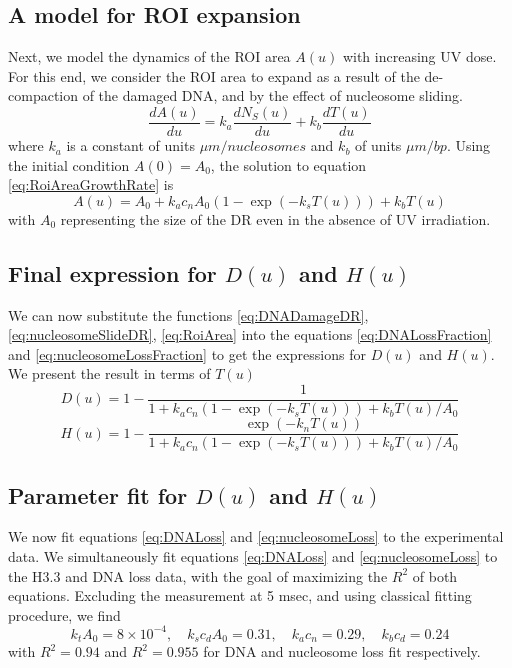 \documentclass[12pt]{article}
\begin{document}
   \subsection{A model for ROI expansion}
	Next, we model the dynamics of the ROI area $A(u)$ with increasing UV
	dose. For this end, we consider the ROI area to expand as a result of the de-compaction of the damaged DNA, and by the effect of nucleosome sliding. 			
	\begin{equation}\label{eq:RoiAreaGrowthRate}
	\frac{dA(u)}{du}=k_a\frac{dN_S(u)}{du}+k_b\frac{dT(u)}{du}
	\end{equation}
	where $k_a$ is a constant of units $\mu m/ nucleosomes$ and $k_b$ of units $\mu m/ bp$. Using the initial condition $A(0) = A_0$, the solution to equation \eqref{eq:RoiAreaGrowthRate} is
	\begin{equation}\label{eq:RoiArea}
	A(u) = A_0+ k_ac_nA_0\left(1-\exp(-k_sT(u))\right)+k_bT(u)
	\end{equation}
	 with $A_0$ representing the size of the DR even in the absence of UV irradiation.
	 
	 \subsection{Final expression for $D(u)$ and $H(u)$}
	We can now substitute the functions \eqref{eq:DNADamageDR}, \eqref{eq:nucleosomeSlideDR}, \eqref{eq:RoiArea} into the equations \eqref{eq:DNALossFraction} and \eqref{eq:nucleosomeLossFraction} to get the expressions for $D(u)$ and $H(u)$. We present the result in terms of $T(u)$
	\begin{equation}\label{eq:DNALoss}
	D(u) = 1-\frac{1}{1+ k_ac_n\left(1-\exp(-k_sT(u))\right)+k_bT(u)/A_0} 
	\end{equation}
	\begin{equation}\label{eq:nucleosomeLoss}
		H(u) = 1- \frac{\exp(-k_nT(u))}{1+ k_ac_n\left(1-\exp(-k_sT(u))\right)+k_bT(u)/A_0}
	\end{equation}
	
	\subsection{Parameter fit for $D(u)$ and $H(u)$}\label{subsection:parameterFit}
	We now fit equations \eqref{eq:DNALoss} and \eqref{eq:nucleosomeLoss} to the experimental data. We simultaneously fit equations \eqref{eq:DNALoss}  and \eqref{eq:nucleosomeLoss} to the H3.3 and DNA loss data, with the goal of maximizing the $R^2$ of both equations. Excluding the measurement at 5 msec, and using classical fitting procedure, we find
	\begin{equation*}
	k_tA_0 = 8\times 10^{-4}, \quad k_sc_dA_0 = 0.31,\quad k_ac_n = 0.29, \quad k_bc_d = 0.24
	\end{equation*}
	with $R^2 = 0.94$ and $R^2 = 0.955$ for DNA and nucleosome loss fit respectively.
	
\end{document}
